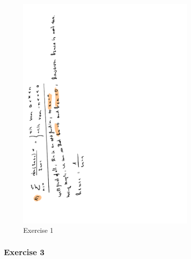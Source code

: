 \documentclass[a4paper]{report}
\begin{document}
\begin{figure}[H]
	\centering
	\includegraphics[angle=-90, width=0.8\textwidth]{assets/huis_9_ex_1.pdf}
	\caption{Exercise 1}
\end{figure}



\subsubsection{Exercise 3}
\end{document}
